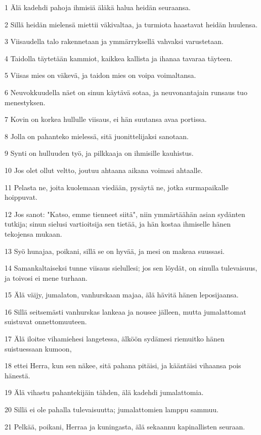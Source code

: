 \par 1 Älä kadehdi pahoja ihmisiä äläkä halua heidän seuraansa.
\par 2 Sillä heidän mielensä miettii väkivaltaa, ja turmiota haastavat heidän huulensa.
\par 3 Viisaudella talo rakennetaan ja ymmärryksellä vahvaksi varustetaan.
\par 4 Taidolla täytetään kammiot, kaikkea kallista ja ihanaa tavaraa täyteen.
\par 5 Viisas mies on väkevä, ja taidon mies on voipa voimaltansa.
\par 6 Neuvokkuudella näet on sinun käytävä sotaa, ja neuvonantajain runsaus tuo menestyksen.
\par 7 Kovin on korkea hullulle viisaus, ei hän suutansa avaa portissa.
\par 8 Jolla on pahanteko mielessä, sitä juonittelijaksi sanotaan.
\par 9 Synti on hulluuden työ, ja pilkkaaja on ihmisille kauhistus.
\par 10 Jos olet ollut veltto, joutuu ahtaana aikana voimasi ahtaalle.
\par 11 Pelasta ne, joita kuolemaan viedään, pysäytä ne, jotka surmapaikalle hoippuvat.
\par 12 Jos sanot: "Katso, emme tienneet siitä", niin ymmärtäähän asian sydänten tutkija; sinun sielusi vartioitsija sen tietää, ja hän kostaa ihmiselle hänen tekojensa mukaan.
\par 13 Syö hunajaa, poikani, sillä se on hyvää, ja mesi on makeaa suussasi.
\par 14 Samankaltaiseksi tunne viisaus sielullesi; jos sen löydät, on sinulla tulevaisuus, ja toivosi ei mene turhaan.
\par 15 Älä väijy, jumalaton, vanhurskaan majaa, älä hävitä hänen leposijaansa.
\par 16 Sillä seitsemästi vanhurskas lankeaa ja nousee jälleen, mutta jumalattomat suistuvat onnettomuuteen.
\par 17 Älä iloitse vihamiehesi langetessa, älköön sydämesi riemuitko hänen suistuessaan kumoon,
\par 18 ettei Herra, kun sen näkee, sitä pahana pitäisi, ja kääntäisi vihaansa pois hänestä.
\par 19 Älä vihastu pahantekijäin tähden, älä kadehdi jumalattomia.
\par 20 Sillä ei ole pahalla tulevaisuutta; jumalattomien lamppu sammuu.
\par 21 Pelkää, poikani, Herraa ja kuningasta, älä sekaannu kapinallisten seuraan.
